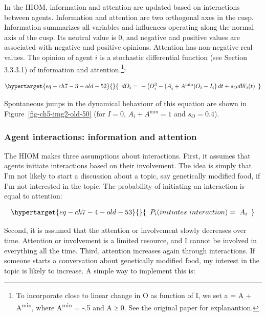 \documentclass[
  letterpaper,
]{scrbook}
\begin{document}
In the HIOM, information and attention are updated based on interactions
between agents. Information and attention are two orthogonal axes in the
cusp. Information summarizes all variables and influences operating
along the normal axis of the cusp. Its neutral value is 0, and negative
and positive values are associated with negative and positive opinions.
Attention has non-negative real values. The opinion of agent \(i\) is a
stochastic differential function (see Section 3.3.3.1) of information
and attention.\footnote{To incorporate close to linear change in O as
  function of I, we set a = A + A\textsuperscript{min}, where
  A\textsuperscript{min} = -.5 and A ≥ 0. See the original paper for
  explanantion.}:

\begin{equation}\protect\hypertarget{eq-ch7-3-old-52}{}{\begin{array}{r}
dO_{i} = \  - \left( O_{i}^{3} - {(A}_{i} + A^{\min})O_{i} - I_{i} \right)dt + s_{O}dW_{i}(t)
\end{array}}\label{eq-ch7-3-old-52}\end{equation}

Spontaneous jumps in the dynamical behaviour of this equation are shown
in Figure~\ref{fig-ch5-img2-old-50} (for \(I = 0\),
\(A_{i} + A^{\min} = 1\) and \(s_{O} = 0.4\)).

\hypertarget{agent-interactions-information-and-attention}{%
\subsubsection{Agent interactions: information and
attention}\label{agent-interactions-information-and-attention}}

The HIOM makes three assumptions about interactions. First, it assumes
that agents initiate interactions based on their involvement. The idea
is simply that I'm not likely to start a discussion about a topic, say
genetically modified food, if I'm not interested in the topic. The
probability of initiating an interaction is equal to attention:

\begin{equation}\protect\hypertarget{eq-ch7-4-old-53}{}{\begin{array}{r}
P_{i}(initiates\ interaction) = \ A_{i}
\end{array}}\label{eq-ch7-4-old-53}\end{equation}

Second, it is assumed that the attention or involvement slowly decreases
over time. Attention or involvement is a limited resource, and I cannot
be involved in everything all the time. Third, attention increases again
through interactions. If someone starts a conversation about genetically
modified food, my interest in the topic is likely to increase. A simple
way to implement this is:
\end{document}
